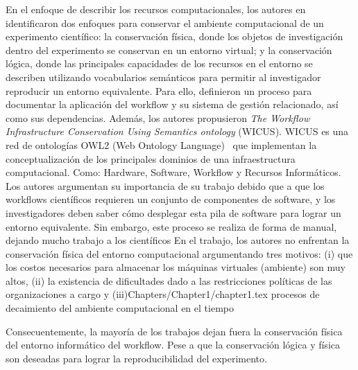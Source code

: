 En el enfoque de describir los recursos computacionales, los autores en \cite{santana2017reproducibility} identificaron dos enfoques para conservar el  ambiente computacional de un experimento científico: la conservación física, donde los objetos de investigación dentro del experimento se conservan en un entorno virtual; y la conservación lógica, donde las principales capacidades de los recursos en el entorno se describen utilizando vocabularios semánticos para permitir al investigador reproducir un entorno equivalente.
Para ello, definieron un proceso para documentar la aplicación del workflow y su sistema de gestión relacionado, así como sus dependencias.
Además, los autores propusieron \textit{The Workflow Infrastructure Conservation Using Semantics ontology} (WICUS). WICUS es una red de ontologías OWL2 (Web Ontology Language)~\cite{motik2009owl} que implementan la conceptualización de los principales dominios de una infraestructura computacional. Como: Hardware, Software, Workflow y Recursos Informáticos. 
Los autores argumentan su importancia de su trabajo debido que a que los workflows científicos requieren un conjunto de componentes de software, y los investigadores deben saber cómo desplegar esta pila de software para lograr un entorno equivalente.
Sin embargo, este proceso se realiza de forma de manual, dejando mucho trabajo a los científicos
En el trabajo, los autores no enfrentan la conservación física del entorno computacional argumentando tres motivos: (i) que los costos necesarios para almacenar los máquinas virtuales (ambiente) son muy altos, (ii) la existencia de dificultades dado a las restricciones políticas de las organizaciones a cargo y (iii)Chapters/Chapter1/chapter1.tex procesos de decaimiento del ambiente computacional en el tiempo~\cite{DBLP:journals/fgcs/DeelmanVJRCMMCS15}


Consecuentemente, la mayoría de los trabajos dejan fuera la conservación física del entorno informático del workflow. Pese a que la conservación lógica y física son deseadas para lograr la reproducibilidad del experimento.

